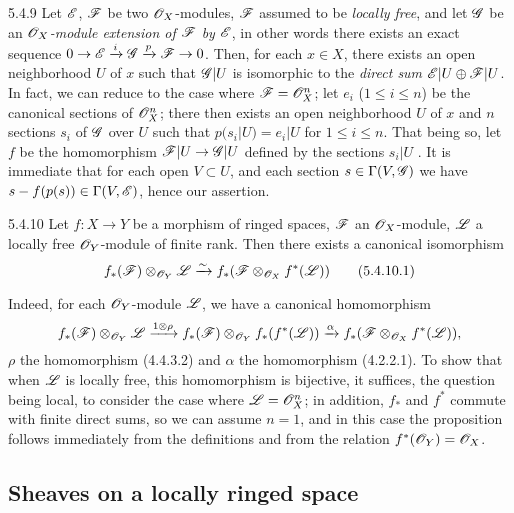 \begin{env}{5.4.9}
\label{env-0.5.4.9}
Let $\mathscr{E}$, $\mathscr{F}$ be two $\mathscr{O}_X$-modules, $\mathscr{F}$ assumed to be \emph{locally free},
and let $\mathscr{G}$ be an \emph{$\mathscr{O}_X$-module extension of $\mathscr{F}$ by $\mathscr{E}$}, in other
words there exists an exact sequence
$0\to\mathscr{E}\xrightarrow{i}\mathscr{G}\xrightarrow{p}\mathscr{F}\to 0$. Then, for each $x\in X$, there
exists an open neighborhood $U$ of $x$ such that $\mathscr{G}|U$ is isomorphic to the \emph{direct
sum $\mathscr{E}|U\oplus\mathscr{F}|U$}. In fact, we can reduce to the case where $\mathscr{F}=\mathscr{O}_X^n$; let
$e_i$ ($1\leqslant i\leqslant n$) be the canonical sections  of $\mathscr{O}_X^n$;
there then exists an open neighborhood $U$ of $x$ and $n$ sections $s_i$ of $\mathscr{G}$ over $U$
such that $p(s_i|U)=e_i|U$ for $1\leqslant i\leqslant n$. That being so, let $f$ be the
homomorphism $\mathscr{F}|U\to\mathscr{G}|U$ defined by the sections $s_i|U$ . It is
immediate that for each open $V\subset U$, and each section $s\in\Gamma(V,\mathscr{G})$ we have
$s-f(p(s))\in\Gamma(V,\mathscr{E})$, hence our assertion.
\end{env}

\begin{env}{5.4.10}
\label{env-0.5.4.10}
Let $f:X\to Y$ be a morphism of ringed spaces, $\mathscr{F}$ an $\mathscr{O}_X$-module, $\mathscr{L}$ a locally
free $\mathscr{O}_Y$-module of finite rank. Then there exists a canonical isomorphism
\[
  f_*(\mathscr{F})\otimes_{\mathscr{O}_Y}\mathscr{L}\xrightarrow{\sim} f_*(\mathscr{F}\otimes_{\mathscr{O}_X}f^*(\mathscr{L}))
  \tag{5.4.10.1}
\]

Indeed, for each $\mathscr{O}_Y$-module $\mathscr{L}$, we have a canonical homomorphism
\[
  f_*(\mathscr{F})\otimes_{\mathscr{O}_Y}\mathscr{L}
  \xrightarrow{1\otimes\rho}f_*(\mathscr{F})\otimes_{\mathscr{O}_Y}f_*(f^*(\mathscr{L}))
  \xrightarrow{\alpha}f_*(\mathscr{F}\otimes_{\mathscr{O}_X}f^*(\mathscr{L})),
\]
$\rho$ the homomorphism (4.4.3.2) and $\alpha$ the homomorphism (4.2.2.1). To show that when
$\mathscr{L}$ is locally free, this homomorphism is bijective, it suffices, the question being
local, to consider the case where $\mathscr{L}=\mathscr{O}_X^n$; in addition, $f_*$ and $f^*$ commute with
finite direct sums, so we can assume $n=1$, and in this case the proposition follows
immediately from the definitions and from the relation $f^*(\mathscr{O}_Y)=\mathscr{O}_X$.
\end{env}

\subsection{Sheaves on a locally ringed space}
\label{0-prelim-5.5}

